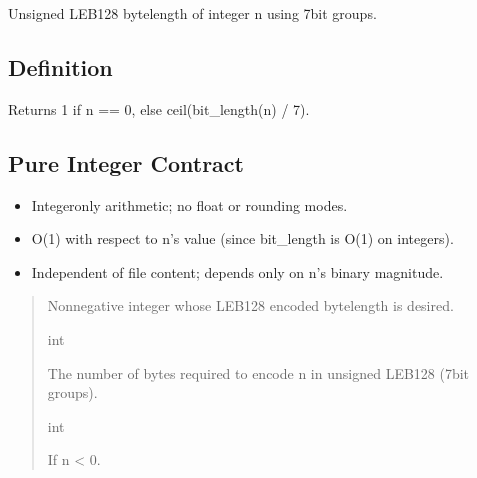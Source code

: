 \documentclass[letterpaper,10pt,english]{sphinxmanual}
\begin{document}
\begin{fulllineitems}
\label{\detokenize{clf_calculator:clf_calculator.leb_len_u}}
\pysigstartsignatures
\pysiglinewithargsret
{}
{}
{}
\pysigstopsignatures
\sphinxAtStartPar
Unsigned LEB128 byte\sphinxhyphen{}length of integer n using 7\sphinxhyphen{}bit groups.


\subsection{Definition}
\label{\detokenize{clf_calculator:definition}}
\sphinxAtStartPar
Returns 1 if n == 0, else ceil(bit\_length(n) / 7).


\subsection{Pure Integer Contract}
\label{\detokenize{clf_calculator:pure-integer-contract}}\begin{itemize}
\item {} 
\sphinxAtStartPar
Integer\sphinxhyphen{}only arithmetic; no float or rounding modes.

\item {} 
\sphinxAtStartPar
O(1) with respect to n’s value (since bit\_length is O(1) on integers).

\item {} 
\sphinxAtStartPar
Independent of file content; depends only on n’s binary magnitude.

\end{itemize}
\begin{quote}\begin{description}
\sphinxAtStartPar
{}

\sphinxAtStartPar
Non\sphinxhyphen{}negative integer whose LEB128 encoded byte\sphinxhyphen{}length is desired.

\sphinxAtStartPar
int

\sphinxAtStartPar
The number of bytes required to encode n in unsigned LEB128 (7\sphinxhyphen{}bit groups).

\sphinxAtStartPar
int

\sphinxAtStartPar
If n \textless{} 0.


\end{description}
\end{quote}
\end{fulllineitems}
\end{document}
